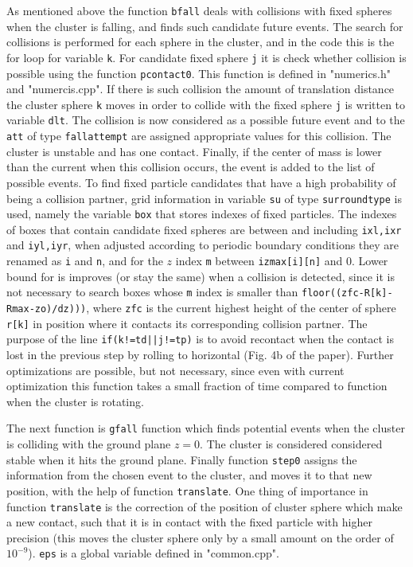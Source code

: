 \documentclass[12pt]{article}
\begin{document}
As mentioned above the function \texttt{bfall} deals with collisions with fixed spheres when the cluster is falling, and finds such candidate future events. The search for collisions is performed for each sphere in the cluster, and in the code this is the for loop for variable \texttt{k}. For candidate fixed sphere \texttt{j} it is check whether collision is possible using the function \texttt{pcontact0}. This function is defined in "numerics.h" and "numercis.cpp". If there is such collision the amount of translation distance the cluster sphere \texttt{k} moves in order to collide with the fixed sphere \texttt{j} is written to variable \texttt{dlt}. The collision is now considered as a possible future event and to the \texttt{att} of type \texttt{fallattempt} are assigned appropriate values for this collision. The cluster is unstable and has one contact. Finally, if the center of mass is lower than the current when this collision occurs, the event is added to the list of possible events. To find fixed particle candidates that have a high probability of being a collision partner, grid information in variable \texttt{su} of type \texttt{surroundtype} is used, namely the variable \texttt{box} that stores indexes of fixed particles. The indexes of boxes that contain candidate fixed spheres are between and including \texttt{ixl,ixr} and \texttt{iyl,iyr}, when adjusted according to periodic boundary conditions they are renamed as \texttt{i} and \texttt{n}, and for the $z$ index \texttt{m} between \texttt{izmax[i][n]} and 0. Lower bound for  is improves (or stay the same) when a collision is detected, since it is not necessary to search boxes whose \texttt{m} index is smaller than \texttt{floor((zfc-R[k]-Rmax-zo)/dz)))}, where \texttt{zfc} is the current highest height of the center of sphere \texttt{r[k]} in position where it contacts its corresponding collision partner. The purpose of the line \texttt{if(k!=td||j!=tp)} is to avoid recontact when the contact is lost in the previous step by rolling to horizontal (Fig. 4b of the paper). Further optimizations are possible, but not necessary, since even with current optimization this function takes a small fraction of time compared to function when the cluster is rotating.

The next function is \texttt{gfall} function which finds potential events when the cluster is colliding with the ground plane $z=0$. The cluster is considered considered stable when it hits the ground plane. Finally function \texttt{step0} assigns the information from the chosen event to the cluster, and moves it to that new position, with the help of function \texttt{translate}. One thing of importance in function \texttt{translate} is the correction of the position of cluster sphere which make a new contact, such that it is in contact with the fixed particle with higher precision (this moves the cluster sphere only by a small amount on the order of $10^{-9}$). \texttt{eps} is a global variable defined in "common.cpp".
\end{document}
